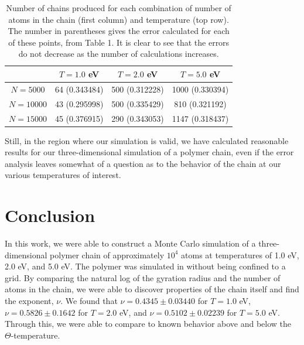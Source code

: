 \documentclass{article}
\begin{document}
\begin{multicols}{2}
\begin{table}
\begin{center}
\begin{tabular}{| c | c | c | c |}
\hline & $T=1.0$ eV & $T = 2.0$ eV & $T = 5.0$ eV \\ \hline
$N=5000$ & 64 (0.343484) & 500 (0.312228) & 1000 (0.330394) \\ \hline
$N=10000$ & 43 (0.295998)  & 500 (0.335429) & 810 (0.321192) \\ \hline
$N=15000$ & 45 (0.376915) & 290 (0.343053) & 1147 (0.318437) \\ \hline
\end{tabular}
\caption{Number of chains produced for each combination of number of atoms in the chain (first column) and temperature (top row).  The number in parentheses gives the error calculated for each of these points, from Table 1.  It is clear to see that the errors do not decrease as the number of calculations increases.}
\end{center}
\end{table}

Still, in the region where our simulation is valid, we have calculated reasonable results for our three-dimensional simulation of a polymer chain, even if the error analysis leaves somewhat of a question as to the behavior of the chain at our various temperatures of interest.   \\

\section{Conclusion}
\label{concl}

In this work, we were able to construct a Monte Carlo simulation of a three-dimensional polymer chain of approximately $10^4$ atoms at temperatures of 1.0 eV, 2.0 eV, and 5.0 eV.  The polymer was simulated in without being confined to a grid.  By comparing the natural log of the gyration radius and the number of atoms in the chain, we were able to discover properties of the chain itself and find the exponent, $\nu$.  We found that $\nu = 0.4345 \pm 0.03440$ for $T = 1.0 $ eV, $\nu = 0.5826 \pm 0.1642$ for $T =2.0$ eV, and $\nu = 0.5102 \pm 0.02239$ for $T=5.0$ eV.  Through this, we were able to compare to known behavior above and below the $\Theta$-temperature.  \\


\end{multicols}
\end{document}
